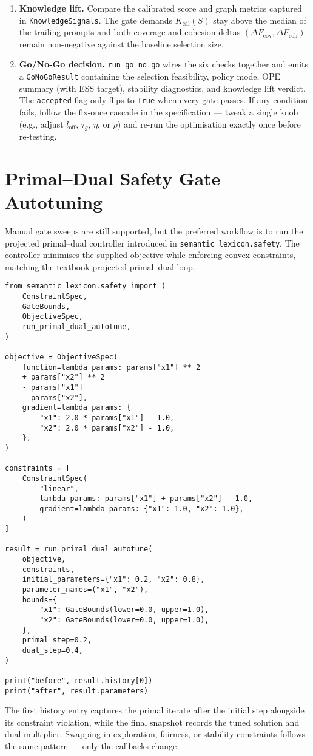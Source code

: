 \documentclass{article}
\begin{document}
\begin{enumerate}[leftmargin=*]
  \item \textbf{Knowledge lift.} Compare the calibrated score and graph metrics captured in \texttt{KnowledgeSignals}. The gate demands $K_{\text{cal}}(S)$ stay above the median of the trailing prompts and both coverage and cohesion deltas $(\Delta F_{\text{cov}}, \Delta F_{\text{coh}})$ remain non-negative against the baseline selection size.
  \item \textbf{Go/No-Go decision.} \texttt{run\_go\_no\_go} wires the six checks together and emits a \texttt{GoNoGoResult} containing the selection feasibility, policy mode, OPE summary (with ESS target), stability diagnostics, and knowledge lift verdict. The \texttt{accepted} flag only flips to \texttt{True} when every gate passes. If any condition fails, follow the fix-once cascade in the specification --- tweak a single knob (e.g., adjust $l_{\text{off}}$, $\tau_g$, $\eta$, or $\rho$) and re-run the optimisation exactly once before re-testing.
\end{enumerate}

\section{Primal--Dual Safety Gate Autotuning}
Manual gate sweeps are still supported, but the preferred workflow is to run the projected primal--dual controller introduced in \texttt{semantic\_lexicon.safety}. The controller minimises the supplied objective while enforcing convex constraints, matching the textbook projected primal--dual loop.

\begin{verbatim}
from semantic_lexicon.safety import (
    ConstraintSpec,
    GateBounds,
    ObjectiveSpec,
    run_primal_dual_autotune,
)

objective = ObjectiveSpec(
    function=lambda params: params["x1"] ** 2
    + params["x2"] ** 2
    - params["x1"]
    - params["x2"],
    gradient=lambda params: {
        "x1": 2.0 * params["x1"] - 1.0,
        "x2": 2.0 * params["x2"] - 1.0,
    },
)

constraints = [
    ConstraintSpec(
        "linear",
        lambda params: params["x1"] + params["x2"] - 1.0,
        gradient=lambda params: {"x1": 1.0, "x2": 1.0},
    )
]

result = run_primal_dual_autotune(
    objective,
    constraints,
    initial_parameters={"x1": 0.2, "x2": 0.8},
    parameter_names=("x1", "x2"),
    bounds={
        "x1": GateBounds(lower=0.0, upper=1.0),
        "x2": GateBounds(lower=0.0, upper=1.0),
    },
    primal_step=0.2,
    dual_step=0.4,
)

print("before", result.history[0])
print("after", result.parameters)
\end{verbatim}
The first history entry captures the primal iterate after the initial step alongside its constraint violation, while the final snapshot records the tuned solution and dual multiplier. Swapping in exploration, fairness, or stability constraints follows the same pattern --- only the callbacks change.
\end{document}
